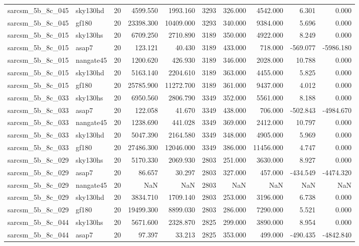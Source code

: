 \begin{tabular}{llrrrrrrrr}
sarcsm\_5b\_8c\_045 & sky130hd & 20 & 4599.550 & 1993.160 & 3293 & 326.000 & 4542.000 & 6.301 & 0.000 \\
sarcsm\_5b\_8c\_045 & gf180 & 20 & 23398.300 & 10409.000 & 3293 & 340.000 & 9384.000 & 5.696 & 0.000 \\
sarcsm\_5b\_8c\_015 & sky130hs & 20 & 6709.250 & 2710.890 & 3189 & 350.000 & 4922.000 & 8.249 & 0.000 \\
sarcsm\_5b\_8c\_015 & asap7 & 20 & 123.121 & 40.430 & 3189 & 433.000 & 718.000 & -569.077 & -5986.180 \\
sarcsm\_5b\_8c\_015 & nangate45 & 20 & 1200.620 & 426.930 & 3189 & 346.000 & 2028.000 & 10.788 & 0.000 \\
sarcsm\_5b\_8c\_015 & sky130hd & 20 & 5163.140 & 2204.610 & 3189 & 363.000 & 4455.000 & 5.825 & 0.000 \\
sarcsm\_5b\_8c\_015 & gf180 & 20 & 25785.900 & 11272.700 & 3189 & 361.000 & 9437.000 & 4.012 & 0.000 \\
sarcsm\_5b\_8c\_033 & sky130hs & 20 & 6950.560 & 2806.790 & 3349 & 352.000 & 5561.000 & 8.188 & 0.000 \\
sarcsm\_5b\_8c\_033 & asap7 & 20 & 122.058 & 41.670 & 3349 & 438.000 & 706.000 & -502.843 & -4984.670 \\
sarcsm\_5b\_8c\_033 & nangate45 & 20 & 1238.690 & 441.028 & 3349 & 369.000 & 2412.000 & 10.797 & 0.000 \\
sarcsm\_5b\_8c\_033 & sky130hd & 20 & 5047.390 & 2164.580 & 3349 & 348.000 & 4905.000 & 5.969 & 0.000 \\
sarcsm\_5b\_8c\_033 & gf180 & 20 & 27486.300 & 12046.000 & 3349 & 386.000 & 11456.000 & 4.747 & 0.000 \\
sarcsm\_5b\_8c\_029 & sky130hs & 20 & 5170.330 & 2069.930 & 2803 & 251.000 & 3630.000 & 8.927 & 0.000 \\
sarcsm\_5b\_8c\_029 & asap7 & 20 & 86.657 & 30.297 & 2803 & 327.000 & 457.000 & -434.549 & -4474.320 \\
sarcsm\_5b\_8c\_029 & nangate45 & 20 & NaN & NaN & 2803 & NaN & NaN & NaN & NaN \\
sarcsm\_5b\_8c\_029 & sky130hd & 20 & 3834.710 & 1709.140 & 2803 & 253.000 & 3196.000 & 6.738 & 0.000 \\
sarcsm\_5b\_8c\_029 & gf180 & 20 & 19499.300 & 8899.030 & 2803 & 286.000 & 7290.000 & 5.521 & 0.000 \\
sarcsm\_5b\_8c\_044 & sky130hs & 20 & 5671.600 & 2328.870 & 2825 & 299.000 & 3890.000 & 8.954 & 0.000 \\
sarcsm\_5b\_8c\_044 & asap7 & 20 & 97.397 & 33.213 & 2825 & 353.000 & 499.000 & -490.435 & -4842.840 \\

\end{tabular}

